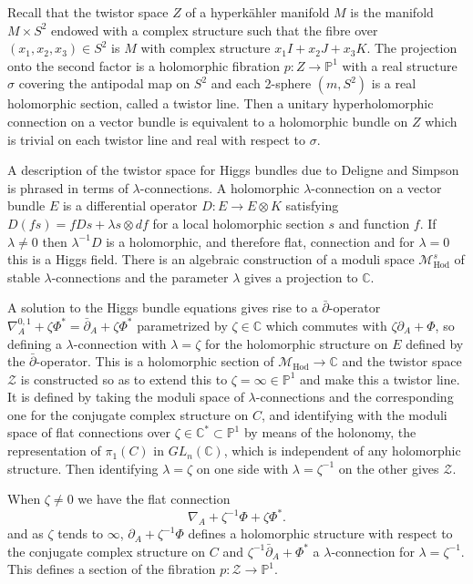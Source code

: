 \documentclass[12pt]{article}
\numberwithin{equation}{section}
\theoremstyle{remark}
\theoremstyle{definition}
\numberwithin{theorem}{section}
\def\C{\mathbb{C}}
\def\M{{\mathcal{M}}}
\renewcommand{\1}{\mathbbm{1}}
\def\PP {\mathbb{P}}
\begin{document}
Recall that the twistor space $Z$ of a hyperk\"ahler manifold $M$ is  the manifold $M\times S^2$ endowed with a complex structure such that the fibre over $(x_1,x_2,x_3)\in S^2$ is $M$ with complex structure $x_1I+x_2J+x_3K$. The projection onto the second factor is a holomorphic fibration $p: Z\rightarrow \PP^1$ with a real structure $\sigma$ covering the antipodal map on $S^2$ and each 2-sphere $(m,S^2)$ is a real holomorphic section, called a twistor line.   Then a unitary hyperholomorphic connection on a vector bundle is equivalent to a holomorphic bundle on $Z$ which is trivial on each twistor line and real with respect to $\sigma$.

A description of the twistor space for Higgs bundles due to Deligne and Simpson \cite{simpson3} is phrased in terms of $\lambda$-connections. A holomorphic $\lambda$-connection on a vector bundle $E$ is a differential operator $D:E\rightarrow E\otimes K$ satisfying 
$D(fs)=fDs+\lambda s\otimes df$ for a local holomorphic section $s$ and function $f$. If $\lambda\ne 0$ then $\lambda^{-1}D$ is a holomorphic, and therefore flat, connection and for $\lambda=0$ this is a Higgs field. There is an algebraic construction of a moduli space ${\M}^s_{\mathrm{Hod}}$ of stable $\lambda$-connections and the parameter $\lambda$ gives a projection to $\C$. 

A solution to the Higgs bundle equations gives rise to a $\bar\partial$-operator $\nabla^{0,1}_A+\zeta\Phi^* =\bar\partial_A+\zeta\Phi^*$ parametrized by $\zeta\in \C$ which commutes with $\zeta\partial _A+ \Phi$, so defining a $\lambda$-connection with $\lambda=\zeta$ for the holomorphic structure on $E$ defined by  the $\bar\partial$-operator. This is a holomorphic section of ${\mathcal M}_{\mathrm{Hod}}\rightarrow \C$ and the twistor space ${\mathcal Z}$ is constructed so as to extend this to $\zeta=\infty\in \PP^1$ and make this a twistor line. It  is defined by  taking the moduli space of $\lambda$-connections  and the corresponding one for the conjugate complex structure on $C$, and identifying with the moduli space of  flat connections over $\zeta\in \C^*\subset \PP^1$ by means of the holonomy, the representation of $\pi_1(C)$ in $GL_n(\C)$, which is independent of any holomorphic structure. Then identifying $\lambda=\zeta$ on one side with $\lambda=\zeta^{-1}$ on the other gives ${\mathcal Z}$. 



When $\zeta\ne 0$ we have the flat connection
\begin{equation}
\nabla_A+\zeta^{-1}\Phi+\zeta \Phi^*.
\label{flatconn} 
\end{equation}
and as $\zeta$  tends to $\infty$, $\partial_A+\zeta^{-1}\Phi$ defines a holomorphic structure with respect to the conjugate complex structure on $C$ and $\zeta^{-1}\bar\partial_A+\Phi^*$  a $\lambda$-connection for $\lambda=\zeta^{-1}$.   This defines a section of the fibration $p: {\mathcal Z}\rightarrow \PP^1$.
\end{document}
